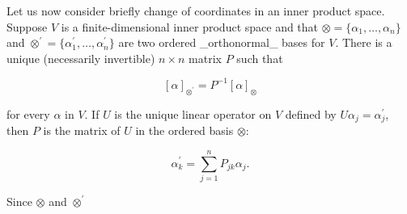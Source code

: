 Let us now consider briefly change of coordinates in an inner product space. Suppose \(V\) is a finite-dimensional inner product space and that \(\otimes=\{\alpha_{1},\ldots,\alpha_{n}\}\) and \(\otimes^{\prime}=\{\alpha_{1}^{\prime},\ldots,\alpha_{n}^{\prime}\}\) are two ordered _orthonormal_ bases for \(V\). There is a unique (necessarily invertible) \(n\times n\) matrix \(P\) such that

\[[\alpha]_{\otimes^{\prime}}=P^{-1}[\alpha]_{\otimes}\]

for every \(\alpha\) in \(V\). If \(U\) is the unique linear operator on \(V\) defined by \(U\alpha_{j}=\alpha_{j}^{\prime}\), then \(P\) is the matrix of \(U\) in the ordered basis \(\otimes\):

\[\alpha_{k}^{\prime}=\sum_{j=1}^{n}P_{jk}\alpha_{j}.\]

Since \(\otimes\) and \(\otimes^{\prime}\) 